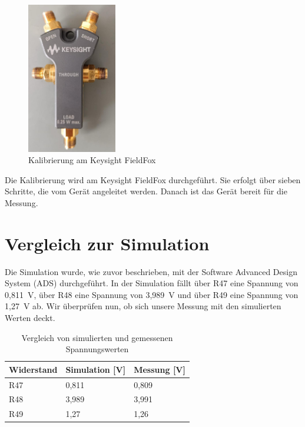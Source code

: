 \begin{figure}[h]
    \centering
    \includegraphics[width=0.35\textwidth]{Pictures/Keysightkallibrierung.jpg}
    \caption{Kalibrierung am Keysight FieldFox}
\end{figure}
Die Kalibrierung wird am Keysight FieldFox durchgeführt. Sie erfolgt über sieben Schritte, die vom Gerät angeleitet werden. Danach ist das Gerät bereit für die Messung.

\section{Vergleich zur Simulation}
Die Simulation wurde, wie zuvor beschrieben, mit der Software Advanced Design System (ADS) durchgeführt. In der Simulation fällt über R47 eine Spannung von 0,811~V, über R48 eine Spannung von 3,989~V und über R49 eine Spannung von 1,27~V ab. Wir überprüfen nun, ob sich unsere Messung mit den simulierten Werten deckt.

\begin{table}[h]
    \centering
    \begin{tabular}{|l|l|l|}
        \hline
        \textbf{Widerstand} & \textbf{Simulation [V]} & \textbf{Messung [V]} \\
        \hline
        R47 & 0{,}811 & 0{,}809 \\
        \hline
        R48 & 3{,}989 & 3{,}991 \\
        \hline
        R49 & 1{,}27  & 1{,}26 \\
        \hline
    \end{tabular}
    \caption{Vergleich von simulierten und gemessenen Spannungswerten}
\end{table}

\clearpage
